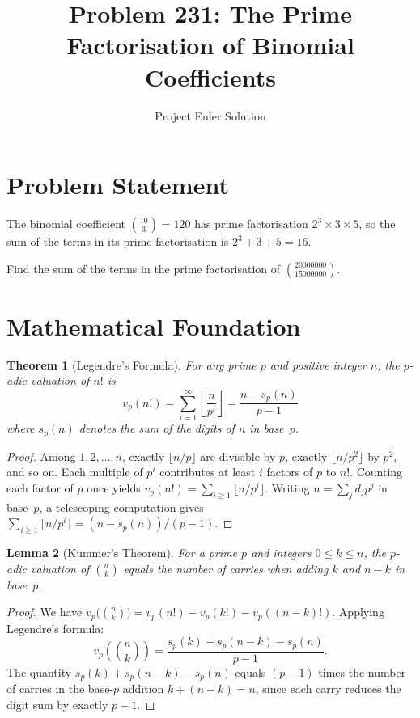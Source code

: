 \documentclass[12pt]{article}
\title{Problem 231: The Prime Factorisation of Binomial Coefficients}
\author{Project Euler Solution}
\date{}
\newtheorem{theorem}{Theorem}
\newtheorem{lemma}[theorem]{Lemma}
\begin{document}
\maketitle

\section{Problem Statement}
The binomial coefficient $\binom{10}{3} = 120$ has prime factorisation $2^3 \times 3 \times 5$, so the sum of the terms in its prime factorisation is $2^3 + 3 + 5 = 16$.

Find the sum of the terms in the prime factorisation of $\binom{20000000}{15000000}$.

\section{Mathematical Foundation}

\begin{theorem}[Legendre's Formula]
For any prime $p$ and positive integer $n$, the $p$-adic valuation of $n!$ is
\[
v_p(n!) = \sum_{i=1}^{\infty} \left\lfloor \frac{n}{p^i} \right\rfloor = \frac{n - s_p(n)}{p - 1}
\]
where $s_p(n)$ denotes the sum of the digits of $n$ in base~$p$.
\end{theorem}

\begin{proof}
Among $1, 2, \ldots, n$, exactly $\lfloor n/p \rfloor$ are divisible by $p$, exactly $\lfloor n/p^2 \rfloor$ by $p^2$, and so on. Each multiple of $p^i$ contributes at least $i$ factors of $p$ to $n!$. Counting each factor of $p$ once yields $v_p(n!) = \sum_{i \geq 1} \lfloor n/p^i \rfloor$. Writing $n = \sum_j d_j p^j$ in base~$p$, a telescoping computation gives $\sum_{i \geq 1} \lfloor n/p^i \rfloor = (n - s_p(n))/(p-1)$.
\end{proof}

\begin{lemma}[Kummer's Theorem]
For a prime $p$ and integers $0 \leq k \leq n$, the $p$-adic valuation of $\binom{n}{k}$ equals the number of carries when adding $k$ and $n-k$ in base~$p$.
\end{lemma}

\begin{proof}
We have $v_p\!\bigl(\binom{n}{k}\bigr) = v_p(n!) - v_p(k!) - v_p((n-k)!)$. Applying Legendre's formula:
\[
v_p\!\left(\binom{n}{k}\right) = \frac{s_p(k) + s_p(n-k) - s_p(n)}{p-1}.
\]
The quantity $s_p(k) + s_p(n-k) - s_p(n)$ equals $(p-1)$ times the number of carries in the base-$p$ addition $k + (n-k) = n$, since each carry reduces the digit sum by exactly $p-1$.
\end{proof}
\end{document}

